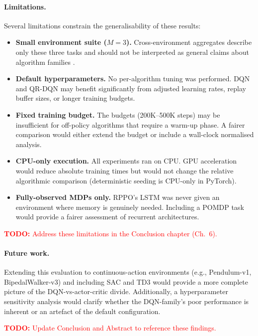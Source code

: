 \paragraph{Limitations.}
Several limitations constrain the generalisability of these results:
\begin{itemize}
  \item \textbf{Small environment suite ($M = 3$).} Cross-environment
        aggregates describe only these three tasks and should not be
        interpreted as general claims about algorithm families
        \citep{agarwal2021precipice, patterson2024edrl}.
  \item \textbf{Default hyperparameters.} No per-algorithm tuning was
        performed. DQN and QR-DQN may benefit significantly from adjusted
        learning rates, replay buffer sizes, or longer training budgets.
  \item \textbf{Fixed training budget.} The budgets (200K--500K steps)
        may be insufficient for off-policy algorithms that require a
        warm-up phase. A fairer comparison would either extend the budget
        or include a wall-clock normalised analysis.
  \item \textbf{CPU-only execution.} All experiments ran on CPU. GPU
        acceleration would reduce absolute training times but would not
        change the relative algorithmic comparison (deterministic seeding
        is CPU-only in PyTorch).
  \item \textbf{Fully-observed MDPs only.} RPPO's LSTM was never given
        an environment where memory is genuinely needed. Including a
        POMDP task would provide a fairer assessment of recurrent
        architectures.
\end{itemize}

\textcolor{red}{\textbf{TODO:} Address these limitations in the Conclusion chapter (Ch.\ 6).}

\paragraph{Future work.}
Extending this evaluation to continuous-action environments
(e.g., Pendulum-v1, BipedalWalker-v3) and including SAC and TD3 would
provide a more complete picture of the DQN-vs-actor-critic divide.
Additionally, a hyperparameter sensitivity analysis would clarify
whether the DQN-family's poor performance is inherent or an artefact
of the default configuration.

\textcolor{red}{\textbf{TODO:} Update Conclusion and Abstract to reference these findings.}

